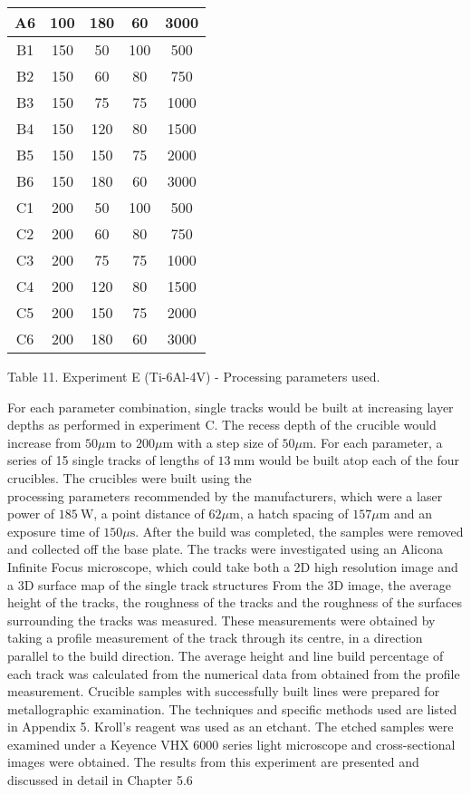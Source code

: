 \documentclass[10pt]{article}
\begin{document}
\begin{center}
\begin{tabular}{|c|c|c|c|c|}
\hline
A6 & 100 & 180 & 60 & 3000 \\
\hline
B1 & 150 & 50 & 100 & 500 \\
\hline
B2 & 150 & 60 & 80 & 750 \\
\hline
B3 & 150 & 75 & 75 & 1000 \\
\hline
B4 & 150 & 120 & 80 & 1500 \\
\hline
B5 & 150 & 150 & 75 & 2000 \\
\hline
B6 & 150 & 180 & 60 & 3000 \\
\hline
C1 & 200 & 50 & 100 & 500 \\
\hline
C2 & 200 & 60 & 80 & 750 \\
\hline
C3 & 200 & 75 & 75 & 1000 \\
\hline
C4 & 200 & 120 & 80 & 1500 \\
\hline
C5 & 200 & 150 & 75 & 2000 \\
\hline
C6 & 200 & 180 & 60 & 3000 \\
\hline
\end{tabular}
\end{center}

Table 11. Experiment E (Ti-6Al-4V) - Processing parameters used.

For each parameter combination, single tracks would be built at increasing layer depths as performed in experiment $\mathrm{C}$. The recess depth of the crucible would increase from $50 \mu \mathrm{m}$ to $200 \mu \mathrm{m}$ with a step size of $50 \mu \mathrm{m}$. For each parameter, a series of 15 single tracks of lengths of $13 \mathrm{~mm}$ would be built atop each of the four crucibles. The crucibles were built using the\\
processing parameters recommended by the manufacturers, which were a laser power of $185 \mathrm{~W}$, a point distance of $62 \mu \mathrm{m}$, a hatch spacing of $157 \mu \mathrm{m}$ and an exposure time of $150 \mu \mathrm{s}$. After the build was completed, the samples were removed and collected off the base plate. The tracks were investigated using an Alicona Infinite Focus microscope, which could take both a 2D high resolution image and a 3D surface map of the single track structures From the 3D image, the average height of the tracks, the roughness of the tracks and the roughness of the surfaces surrounding the tracks was measured. These measurements were obtained by taking a profile measurement of the track through its centre, in a direction parallel to the build direction. The average height and line build percentage of each track was calculated from the numerical data from obtained from the profile measurement. Crucible samples with successfully built lines were prepared for metallographic examination. The techniques and specific methods used are listed in Appendix 5. Kroll's reagent was used as an etchant. The etched samples were examined under a Keyence VHX 6000 series light microscope and cross-sectional images were obtained. The results from this experiment are presented and discussed in detail in Chapter 5.6
\end{document}
